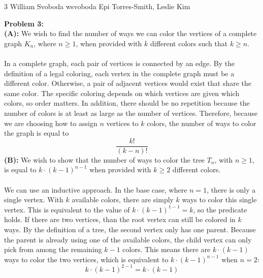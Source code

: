 \documentclass[12pt,letterpaper]{cos340hw}
\begin{document}
           {3}            %
           {William Svoboda}  %
           {wsvoboda}   %
           {Epi Torres-Smith, Leslie Kim} 




\noindent\textbf{Problem 3:}\\
\noindent\textbf{(A):} We wish to find the number of ways we can color the vertices of a complete graph 
$K_n$, where $n \ge 1$, when provided with $k$ different colors such that $k \ge n$.\\\\
In a complete graph, each pair of vertices is connected by an edge. By the definition of a legal coloring, 
each vertex in the complete graph must be a different color. Otherwise, a pair of adjacent vertices would 
exist that share the same color. The specific coloring depends on which vertices are given which colors, 
so order matters. In addition, there should be no repetition because the number of colors is at least as large as 
the number of vertices. Therefore, because we are choosing how to assign $n$ vertices to $k$ colors, the number 
of ways to color the graph is equal to
$$\frac{k!}{(k-n)!}$$
\noindent\textbf{(B):} We wish to show that the number of ways to color the tree $T_n$, with $n \ge 1$, is equal 
to $k \cdot (k-1)^{n-1}$ when provided with $k \ge 2$ different colors.\\\\
We can use an inductive approach. In the base case, where $n=1$, there is only a single vertex. With $k$ available 
colors, there are simply $k$ ways to color this single vertex. This is equivalent to the value of 
$k \cdot (k-1)^{1-1}=k$, so the predicate holds. If there are two vertices, than the root vertex can still be 
colored in $k$ ways. By the definition of a tree, the second vertex only has one parent. Because the parent is 
already using one of the available colors, the child vertex can only pick from among the remaining $k-1$ colors. 
This means there are $k \cdot (k-1)$ ways to color the two vertices, which is equivalent to $k \cdot (k-1)^{n-1}$ 
when $n=2$:
$$k \cdot (k-1)^{2-1}=k \cdot (k-1)$$
\end{document}
